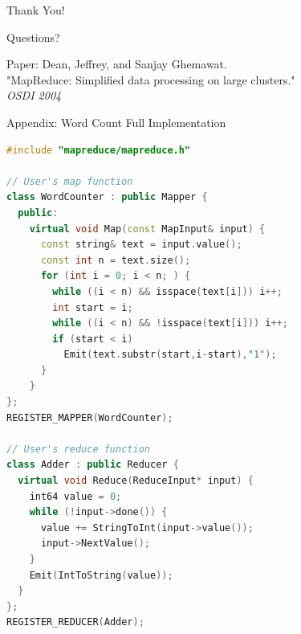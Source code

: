 \documentclass[aspectratio=169]{beamer}
\begin{document}
\begin{frame}[standout]
\Huge Thank You!

\vspace{1cm}

\normalsize
Questions?

\vspace{1cm}

\footnotesize
Paper: Dean, Jeffrey, and Sanjay Ghemawat. \\
"MapReduce: Simplified data processing on large clusters." \\
\textit{OSDI 2004}
\end{frame}

\appendix

\begin{frame}[fragile]{Appendix: Word Count Full Implementation}
\begin{lstlisting}[language=C++, basicstyle=\ttfamily\tiny]
#include "mapreduce/mapreduce.h"

// User's map function
class WordCounter : public Mapper {
  public:
    virtual void Map(const MapInput& input) {
      const string& text = input.value();
      const int n = text.size();
      for (int i = 0; i < n; ) {
        while ((i < n) && isspace(text[i])) i++;
        int start = i;
        while ((i < n) && !isspace(text[i])) i++;
        if (start < i)
          Emit(text.substr(start,i-start),"1");
      }
    }
};
REGISTER_MAPPER(WordCounter);

// User's reduce function
class Adder : public Reducer {
  virtual void Reduce(ReduceInput* input) {
    int64 value = 0;
    while (!input->done()) {
      value += StringToInt(input->value());
      input->NextValue();
    }
    Emit(IntToString(value));
  }
};
REGISTER_REDUCER(Adder);
\end{lstlisting}
\end{frame}
\end{document}
